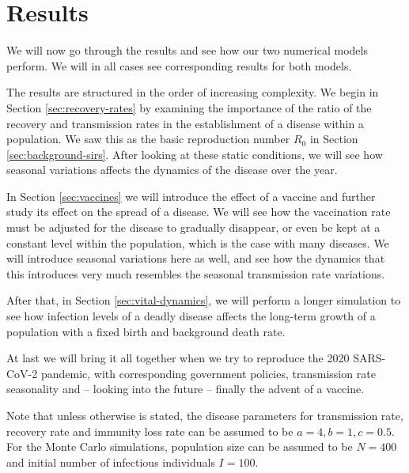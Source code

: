 \documentclass[]{article}
\begin{document}
\section{Results} \label{sec:results}

We will now go through the results and see how our two numerical models perform. We will in all cases see corresponding results for both models. 

The results are structured in the order of increasing complexity. We begin in Section \ref{sec:recovery-rates} by examining the importance of the ratio of the recovery and transmission rates in the establishment of a disease within a population. We saw this as the basic reproduction number $R_0$ in Section \ref{sec:background-sirs}. After looking at these static conditions, we will see how seasonal variations affects the dynamics of the disease over the year.

In Section \ref{sec:vaccines} we will introduce the effect of a vaccine and further study its effect on the spread of a disease. We will see how the vaccination rate must be adjusted for the disease to gradually disappear, or even be kept at a constant level within the population, which is the case with many diseases. We will introduce seasonal variations here as well, and see how the dynamics that this introduces very much resembles the seasonal transmission rate variations.

After that, in Section \ref{sec:vital-dynamics}, we will perform a longer simulation to see how infection levels of a deadly disease affects the long-term growth of a population with a fixed birth and background death rate.

At last we will bring it all together when we try to reproduce the 2020 SARS-CoV-2 pandemic, with corresponding government policies, transmission rate seasonality and -- looking into the future -- finally the advent of a vaccine.

Note that unless otherwise is stated, the disease parameters for transmission rate, recovery rate and immunity loss rate can be assumed to be $a=4, b=1, c=0.5$. For the Monte Carlo simulations, population size can be assumed to be $N=400$ and initial number of infectious individuals $I=100$.
\end{document}
